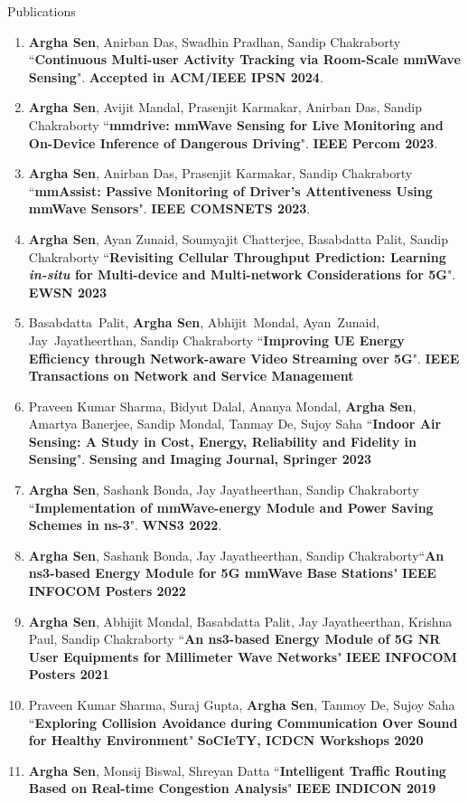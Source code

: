\documentclass{resume} %
\begin{document}
\begin{rSection}{Publications}
\begin{enumerate}
			\item \textbf{Argha Sen}, Anirban Das, Swadhin Pradhan, Sandip Chakraborty ``\textbf{Continuous Multi-user Activity Tracking via Room-Scale mmWave Sensing}". \textbf{Accepted in ACM/IEEE IPSN 2024}.
			
			\item \textbf{Argha Sen}, Avijit Mandal, Prasenjit Karmakar, Anirban Das, Sandip Chakraborty ``\textbf{mmdrive: mmWave Sensing for Live Monitoring and On-Device Inference of Dangerous Driving}". \textbf{IEEE Percom 2023}.
			
			\item \textbf{Argha Sen}, Anirban Das, Prasenjit Karmakar, Sandip Chakraborty ``\textbf{mmAssist: Passive Monitoring of Driver's Attentiveness Using mmWave Sensors}". \textbf{IEEE COMSNETS 2023}.
			
			\item \textbf{Argha Sen}, Ayan Zunaid, Soumyajit Chatterjee, Basabdatta Palit, Sandip Chakraborty ``\textbf{Revisiting Cellular Throughput Prediction: Learning \textit{in-situ} for Multi-device and Multi-network Considerations for 5G}". \textbf{EWSN 2023}
			
			\item Basabdatta~Palit, \textbf{Argha Sen}, Abhijit~Mondal, Ayan~Zunaid, Jay~Jayatheerthan, Sandip Chakraborty ``\textbf{Improving UE Energy Efficiency through Network-aware Video Streaming over 5G}". \textbf{IEEE Transactions on Network and Service Management}
			\item Praveen Kumar Sharma, Bidyut Dalal, Ananya Mondal, \textbf{Argha Sen}, Amartya Banerjee, Sandip Mondal, Tanmay De, Sujoy Saha ``\textbf{Indoor Air Sensing: A Study in Cost, Energy, Reliability and Fidelity in Sensing}". \textbf{Sensing and Imaging Journal, Springer 2023}
			\item \textbf{Argha Sen}, Sashank Bonda, Jay Jayatheerthan, Sandip Chakraborty ``\textbf{Implementation of mmWave-energy Module and Power Saving Schemes in ns-3}". \textbf{WNS3 2022}.
			\item \textbf{Argha Sen}, Sashank Bonda, Jay Jayatheerthan, Sandip Chakraborty``\textbf{An ns3-based Energy Module for 5G mmWave Base Stations}" \textbf{IEEE INFOCOM Posters 2022}
			\item \textbf{Argha Sen}, Abhijit Mondal, Basabdatta Palit, Jay Jayatheerthan, Krishna Paul, Sandip Chakraborty ``\textbf{An ns3-based Energy Module of 5G NR User Equipments for Millimeter Wave Networks}" \textbf{IEEE INFOCOM Posters 2021}
			\item Praveen Kumar Sharma, Suraj Gupta, \textbf{Argha Sen}, Tanmoy De, Sujoy Saha ``\textbf{Exploring Collision Avoidance during Communication Over Sound for Healthy Environment}" \textbf{SoCIeTY, ICDCN Workshops 2020}
			\item \textbf{Argha Sen}, Monsij Biswal, Shreyan Datta ``\textbf{Intelligent Traffic Routing Based on Real-time Congestion Analysis}" \textbf{IEEE INDICON 2019}
			
		\end{enumerate}
	\end{rSection}
	
\end{document}
